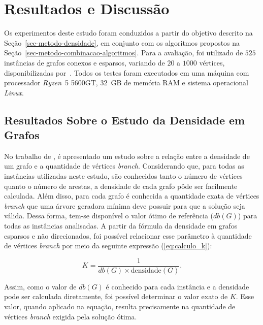 \section{Resultados e Discussão}
\label{sec-resultados}

Os experimentos deste estudo foram conduzidos a partir do objetivo descrito na Seção~\ref{sec-metodo-densidade}, em conjunto com os algoritmos propostos na Seção~\ref{sec-metodo-combinacao-algoritmos}. Para a avaliação, foi utilizado de $525$ instâncias de grafos conexos e esparsos, variando de $20$ a $1000$ vértices, disponibilizadas por~\cite{carrabsIntancias:2013}. Todos os testes foram executados em uma máquina com processador \textit{Ryzen}~5 5600GT, $32$~GB de memória RAM e sistema operacional \textit{Linux}.



\subsection{Resultados Sobre o Estudo da Densidade em Grafos}

No trabalho de \cite{lima2024ils}, é apresentado um estudo sobre a relação entre a densidade de um grafo e a quantidade de vértices \textit{branch}. Considerando que, para todas as instâncias utilizadas neste estudo, são conhecidos tanto o número de vértices quanto o número de arestas, a densidade de cada grafo pôde ser facilmente calculada. Além disso, para cada grafo é conhecida a quantidade exata de vértices \textit{branch} que uma árvore geradora mínima deve possuir para que a solução seja válida. Dessa forma, tem-se disponível o valor ótimo de referência ($db(G)$) para todas as instâncias analisadas. A partir da fórmula da densidade em grafos esparsos e não direcionados, foi possível relacionar esse parâmetro à quantidade de vértices \textit{branch} por meio da seguinte expressão (\ref{eq:calculo_k}): 

\begin{equation}
\label{eq:calculo_k}
K = \frac{1}{db(G) \times \text{densidade}(G)}.
\end{equation}

Assim, como o valor de $db(G)$ é conhecido para cada instância e a densidade pode ser calculada diretamente, foi possível determinar o valor exato de $K$. Esse valor, quando aplicado na equação, resulta precisamente na quantidade de vértices \textit{branch} exigida pela solução ótima.




